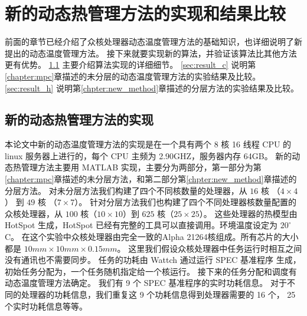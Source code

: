 
\chapter{新的动态热管理方法的实现和结果比较}\label{sec:exp}

前面的章节已经介绍了众核处理器动态温度管理方法的基础知识，也详细说明了新提出的动态温度管理方法。
接下来就要实现新的算法，并验证该算法比其他方法更有优势。
 \ref{sec:method_implement} 主要介绍算法实现的详细细节。 
 \ref{sec:result_c} 说明第\ref{chapter:mpc}章描述的未分层的动态温度管理方法的实验结果及比较。
 \ref{sec:result_h} 说明第\ref{chpter:new_method}章描述的分层方法的实验结果及比较。
\section{新的动态热管理方法的实现}\label{sec:method_implement}
本论文中新的动态温度管理方法的实现是在一个具有两个 8 核 16 线程 CPU 的 linux 服务器上进行的，每个 CPU 主频为 2.90GHZ，服务器内存 64GB。
新的动态热管理方法主要用 MATLAB 实现，主要分为两部分，第一部分为第\ref{chapter:mpc}章描述的未分层方法，和第二部分第\ref{chpter:new_method}章描述的分层方法。
对未分层方法我们构建了四个不同核数量的处理器，从 $16$  核 （$4 \times 4$） 到 $49$  核 （$7 \times 7$）。
针对分层方法我们也构建了四个不同处理器核数量配置的众核处理器，从 $100$ 核（$10 \times 10$）到 $625$ 核（$25 \times 25$）。
这些处理器的热模型由 HotSpot 生成，HotSpot 已经有完整的工具可以直接调用。环境温度设定为 $20^{\circ}$C。
在这个实验中众核处理器由完全一致的Alpha 21264核组成。所有芯片的大小都是 $10mm \times 10mm \times 0.15mm$。
这里我们假设众核处理器中任务运行时相互之间没有通讯也不需要同步。
任务的功耗由 Wattch 通过运行 SPEC 基准程序   生成，初始任务分配为，一个任务随机指定给一个核运行。
接下来的任务分配和调度有动态温度管理方法确定。
我们有 9 个 SPEC 基准程序的实时功耗信息。
对于不同的处理器的功耗信息，我们重复这 9 个功耗信息得到处理器需要的 16 个， 25个实时功耗信息等等。

